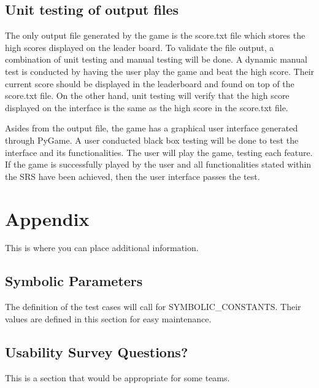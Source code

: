 \documentclass[12pt, titlepage]{article}
\begin{document}
\subsection{Unit testing of output files}		

The only output file generated by the game is the score.txt file which stores the high scores displayed on the leader board. To validate the file output, a combination of unit testing and manual testing will be done. A dynamic manual test is conducted by having the user play the game and beat the high score. Their current score should be displayed in the leaderboard and found on top of the score.txt file. On the other hand, unit testing will verify that the high score displayed on the interface is the same as the high score in the score.txt file. 

Asides from the output file, the game has a graphical user interface generated through PyGame. A user conducted black box testing will be done to test the interface and its functionalities. The user will play the game, testing each feature. If the game is successfully played by the user and all functionalities stated within the SRS have been achieved, then the user interface passes the test.






\newpage

\section{Appendix}

This is where you can place additional information.

\subsection{Symbolic Parameters}

The definition of the test cases will call for SYMBOLIC\_CONSTANTS.
Their values are defined in this section for easy maintenance.

\subsection{Usability Survey Questions?}

This is a section that would be appropriate for some teams.
\end{document}
